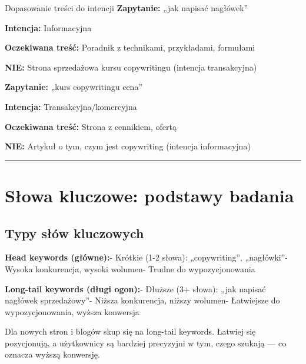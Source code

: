 \documentclass[
  12pt,
  a4paper,
  twoside,
  openright,
  12pt,
  DIV=12,
  BCOR=12mm]{scrbook}
\newcommand{\decoline}{%
  \begin{center}
    \textcolor{bordergray}{\rule{0.3\textwidth}{0.5pt}}
  \end{center}
}
\begin{document}
\begin{przyklad}{Dopasowanie treści do intencji}
\textbf{Zapytanie:} „jak napisać nagłówek”

\textbf{Intencja:} Informacyjna

\textbf{Oczekiwana treść:} Poradnik z technikami, przykładami, formułami

\textbf{NIE:} Strona sprzedażowa kursu copywritingu (intencja transakcyjna)

\textbf{Zapytanie:} „kurs copywritingu cena”

\textbf{Intencja:} Transakcyjna/komercyjna

\textbf{Oczekiwana treść:} Strona z cennikiem, ofertą

\textbf{NIE:} Artykuł o tym, czym jest copywriting (intencja informacyjna)
\end{przyklad}

\decoline

\section{Słowa kluczowe: podstawy
badania}\label{sux142owa-kluczowe-podstawy-badania}

\subsection{Typy słów kluczowych}\label{typy-sux142uxf3w-kluczowych}

\textbf{Head keywords (główne):}\newline - Krótkie (1-2 słowa):
„copywriting'', „nagłówki''\newline - Wysoka konkurencja, wysoki
wolumen\newline - Trudne do wypozycjonowania\newline

\textbf{Long-tail keywords (długi ogon):}\newline - Dłuższe (3+ słowa):
„jak napisać nagłówek sprzedażowy''\newline - Niższa konkurencja, niższy
wolumen\newline - Łatwiejsze do wypozycjonowania, wyższa
konwersja\newline

\begin{wskazowka}
Dla nowych stron i blogów skup się na long-tail keywords. Łatwiej się pozycjonują, a użytkownicy są bardziej precyzyjni w tym, czego szukają --- co oznacza wyższą konwersję.
\end{wskazowka}
\end{document}
